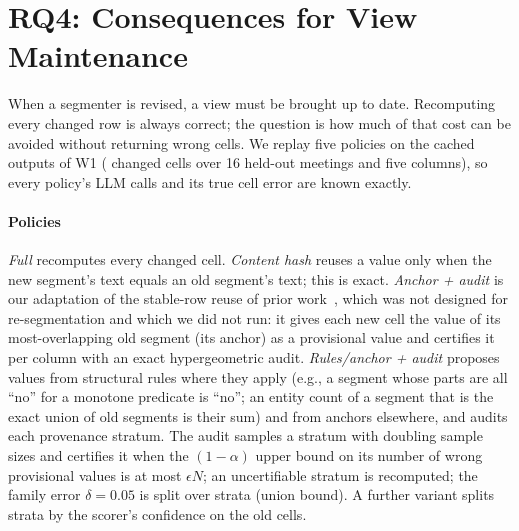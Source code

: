 \documentclass[conference]{IEEEtran}
\begin{document}
\section{RQ4: Consequences for View Maintenance}\label{sec:rq4}
When a segmenter is revised, a view must be brought up to date. Recomputing every changed row is always correct; the
question is how much of that cost can be avoided without returning wrong cells. We replay five policies on the cached
outputs of W1 (\nEWonecells{} changed cells over 16 held-out meetings and five columns), so every policy's LLM calls
and its true cell error are known exactly.
\paragraph*{Policies}
\emph{Full} recomputes every changed cell. \emph{Content hash} reuses a value only when the new segment's text equals
an old segment's text; this is exact. \emph{Anchor + audit} is our adaptation of the stable-row reuse of prior work~\cite{sivm,semreuse}, which was not
designed for re-segmentation and which we did not run:
it gives each new cell the value of its most-overlapping old segment (its anchor) as a provisional value and certifies
it per column with an exact hypergeometric audit. \emph{Rules/anchor + audit} proposes values from structural
rules where they apply (e.g., a segment whose parts are all ``no'' for a monotone predicate is ``no''; an entity count
of a segment that is the exact union of old segments is their sum) and from anchors elsewhere, and audits each
provenance stratum. The audit samples a stratum with doubling sample sizes and certifies it when the $(1-\alpha)$ upper
bound on its number of wrong provisional values is at most $\epsilon N$; an uncertifiable stratum is recomputed; the
family error $\delta=0.05$ is split over strata (union bound). A further variant splits strata by the scorer's
confidence on the old cells.
\begin{table}[t]
\centering\footnotesize
\caption{View maintenance on held-out meetings: LLM calls as a share of full recomputation, with the 95\% interval of
a meeting bootstrap in which the whole policy is re-run in each resample, and the true cell error in percent; means
of 100 trials, family error $\delta=0.05$. Content hashing does not depend on $\epsilon$ and has no error.}
\label{tab:maint}

\end{table}
\end{document}
